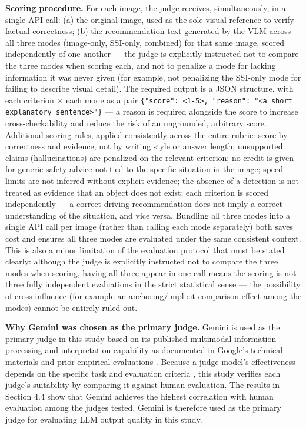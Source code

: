 \documentclass[12pt,a4paper]{report}
\begin{document}
\textbf{Scoring procedure.} For each image, the judge receives, simultaneously, in a single API call: (a) the original image, used as the sole visual reference to verify factual correctness; (b) the recommendation text generated by the VLM across all three modes (image-only, SSI-only, combined) for that same image, scored independently of one another --- the judge is explicitly instructed not to compare the three modes when scoring each, and not to penalize a mode for lacking information it was never given (for example, not penalizing the SSI-only mode for failing to describe visual detail). The required output is a JSON structure, with each criterion $\times$ each mode as a pair \texttt{\{"score": <1-5>, "reason": "<a short explanatory sentence>"\}} --- a reason is required alongside the score to increase cross-checkability and reduce the risk of an ungrounded, arbitrary score. Additional scoring rules, applied consistently across the entire rubric: score by correctness and evidence, not by writing style or answer length; unsupported claims (hallucinations) are penalized on the relevant criterion; no credit is given for generic safety advice not tied to the specific situation in the image; speed limits are not inferred without explicit evidence; the absence of a detection is not treated as evidence that an object does not exist; each criterion is scored independently --- a correct driving recommendation does not imply a correct understanding of the situation, and vice versa. Bundling all three modes into a single API call per image (rather than calling each mode separately) both saves cost and ensures all three modes are evaluated under the same consistent context. This is also a minor limitation of the evaluation protocol that must be stated clearly: although the judge is explicitly instructed not to compare the three modes when scoring, having all three appear in one call means the scoring is not three fully independent evaluations in the strict statistical sense --- the possibility of cross-influence (for example an anchoring/implicit-comparison effect among the modes) cannot be entirely ruled out.

\textbf{Why Gemini was chosen as the primary judge.} Gemini is used as the primary judge in this study based on its published multimodal information-processing and interpretation capability as documented in Google's technical materials \cite{geminiteam2024} and prior empirical evaluations \cite{imran2024gemini}. Because a judge model's effectiveness depends on the specific task and evaluation criteria \cite{qi2023geminivsgpt4v}, this study verifies each judge's suitability by comparing it against human evaluation. The results in Section 4.4 show that Gemini achieves the highest correlation with human evaluation among the judges tested. Gemini is therefore used as the primary judge for evaluating LLM output quality in this study.
\end{document}
